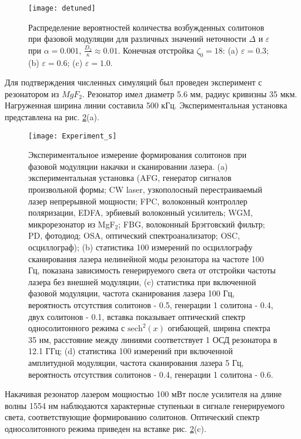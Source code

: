 \begin{figure}[ht]
\centering
  \texttt{[image: detuned]}
  \caption{Распределение вероятностей количества возбужденных солитонов при фазовой модуляции для различных значений неточности $ \Delta$  и $\varepsilon$  при  $\alpha=0.001$, $\frac{D_2}{\kappa}\approx 0.01 $. Конечная отстройка $\zeta_0=18$: (a) $\varepsilon=0.3$; (b) $\varepsilon=0.6$; (c) $\varepsilon=1.0$.}
  \label{Detuned}
\end{figure}

Для подтверждения численных симуляций был проведен эксперимент с резонатором из $MgF_2$. Резонатор имел диаметр 5.6 мм, радиус кривизны 35 мкм. Нагруженная ширина линии составила 500 кГц. Экспериментальная установка представлена на рис. \ref{chaos_order_experiment}(a).

\begin{figure}[ht]
\centering
  \texttt{[image: Experiment\_s]}
  \caption{Экспериментальное измерение формирования солитонов при фазовой модуляции накачки и сканировании лазера. (a) экспериментальная установка (AFG, генератор сигналов произвольной формы; CW laser, узкополосный перестраиваемый лазер непрерывной мощности; FPC, волоконный контроллер поляризации, EDFA, эрбиевый волоконный усилитель; WGM,  микрорезонатор из MgF$_2$; FBG, волоконный Брэгговский фильтр; PD, фотодиод; OSA, оптический спектроанализатор; OSC, осциллограф); (b) статистика 100 измерений по осциллографу сканирования лазера нелинейной моды резонатора на частоте 100 Гц, показана зависимость генерируемого света от отстройки частоты лазера без внешней модуляции, (c) статистика при включенной фазовой модуляции, частота сканирования лазера 100 Гц, вероятность отсутствия солитонов - 0.5, генерации 1 солитона - 0.4, двух солитонов - 0.1, вставка показывает оптический спектр односолитонного режима с $\text{sech}^2(x)$ огибающей, ширина спектра 35 нм, расстояние между линиями соответствует 1 ОСД резонатора в 12.1 ГГц; (d) статистика 100 измерений при включенной амплитудной модуляции, частота сканирования лазера 5 Гц, вероятность отсутствия солитонов - 0.4, генерации 1 солитона - 0.6.}
  \label{chaos_order_experiment}
\end{figure}

Накачивая резонатор лазером мощностью 100 мВт после усилителя на длине волны 1554 нм наблюдаются характерные ступеньки в сигнале генерируемого света, соответствующие формированию солитонов. Оптический спектр односолитонного режима приведен на вставке рис. \ref{chaos_order_experiment}(c).

